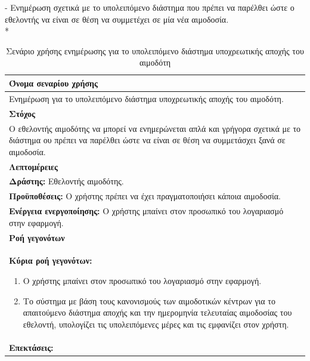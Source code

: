 \newpage		
- Ενημέρωση σχετικά με το υπολειπόμενο διάστημα που πρέπει να παρέλθει ώστε ο εθελοντής να είναι σε θέση να συμμετέχει σε μία νέα αιμοδοσία.
\\*
\begin{table}[H]
	\begin{center}
	    \begin{tabular}{|p{\dimexpr \linewidth-2\tabcolsep}|}
	    \hline
	    \rowcolor{grayy}
	    \textbf{Όνομα σεναρίου χρήσης}
	    \\ \hline    
	     Ενημέρωση για το υπολειπόμενο διάστημα υποχρεωτικής αποχής του αιμοδότη.
	     \\ \hline
	    \rowcolor{grayy}
	    \textbf{\textbf{Στόχος}}
	    \\ \hline
	 	 Ο εθελοντής αιμοδότης να μπορεί να ενημερώνεται απλά και γρήγορα σχετικά με το διάστημα ου πρέπει να παρέλθει ώστε να είναι σε θέση να συμμετάσχει ξανά σε αιμοδοσία.
	    \\ \hline
	    \rowcolor{grayy}
	    \textbf{Λεπτομέρειες}
	    \\ \hline
		\textbf{Δράστης:} Εθελοντής αιμοδότης.
		\\*
		\textbf{Προϋποθέσεις:} Ο χρήστης πρέπει να έχει πραγματοποιήσει κάποια αιμοδοσία.
		\\*
		\textbf{Ενέργεια ενεργοποίησης:} Ο χρήστης μπαίνει στον προσωπικό του λογαριασμό στην εφαρμογή.
		\\ \hline
		\rowcolor{grayy}    
	    \textbf{Ροή γεγονότων}
	    \\ \hline
		\textbf{Κύρια ροή γεγονότων:}
		\begin{enumerate}
			\item	 Ο χρήστης μπαίνει στον προσωπικό του λογαριασμό στην εφαρμογή.
			\item  Το σύστημα με βάση τους κανονισμούς των αιμοδοτικών κέντρων για το απαιτούμενο διάστημα αποχής και την ημερομηνία τελευταίας αιμοδοσίας του εθελοντή, υπολογίζει τις υπολειπόμενες μέρες και τις εμφανίζει στον χρήστη.
		\end{enumerate}
		\\ \hline
		\rowcolor{grayy}
		\textbf{Επεκτάσεις:}
		   \\ \hline
	    \end{tabular}
	    \caption{Σενάριο χρήσης ενημέρωσης για το υπολειπόμενο διάστημα υποχρεωτικής αποχής του αιμοδότη}
	    \label{tab:show_days_for_eligibility_to_donate} 
	\end{center}
\end{table}

